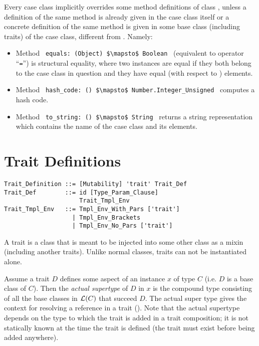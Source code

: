 Every case class implicitly overrides some method definitions of class , unless a definition of the same method is already given in the case class itself or a concrete definition of the same method is given in some base class (including traits) of the case class, different from . Namely: 
\begin{itemize}
  \item[] Method ~\lstinline!equals: (Object) $\mapsto$ Boolean!~ (equivalent to operator ``\lstinline!=!'') is structural equality, where two instances are equal if they both belong to the case class in question and they have equal (with respect to ) elements. 

  \item[] Method ~\lstinline!hash_code: () $\mapsto$ Number.Integer_Unsigned!~ computes a hash code. 

  \item[] Method ~\lstinline!to_string: () $\mapsto$ String!~ returns a string representation which contains the name of the case class and its elements. 
\end{itemize}





\section{Trait Definitions}
\label{sec:traits}

\syntax\begin{lstlisting}
Trait_Definition ::= [Mutability] 'trait' Trait_Def
Trait_Def        ::= id [Type_Param_Clause] 
                     Trait_Tmpl_Env
Trait_Tmpl_Env   ::= Tmpl_Env_With_Pars ['trait']
                   | Tmpl_Env_Brackets
                   | Tmpl_Env_No_Pars ['trait']
\end{lstlisting}

A trait is a class that is meant to be injected into some other class as a mixin (including another traits). Unlike normal classes, traits can not be instantiated alone. 

Assume a trait $D$ defines some aspect of an instance $x$ of type $C$ (i.e. $D$ is a base class of $C$). Then the {\em actual supertype} of $D$ in $x$ is the compound type consisting of all the base classes in ${\cal L}(C)$ that succeed $D$. The actual super type gives the context for resolving a  reference in a trait (). Note that the actual supertype depends on the type to which the trait is added in a trait composition; it is not statically known at the time the trait is defined (the trait must exist before being added anywhere). 

